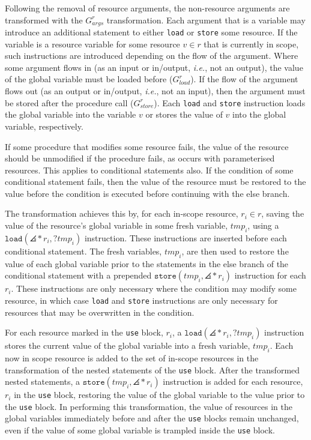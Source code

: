 Following the removal of resource arguments, the non-resource arguments are transformed with the $G_{args}^r$ transformation. Each argument that is a variable may introduce an additional statement to either \texttt{load} or \texttt{store} some resource. If the variable is a resource variable for some resource $v \in r$ that is currently in scope, such instructions are introduced depending on the flow of the argument. Where some argument flows in (as an input or in/output, \textit{i.e.}, not an output), the value of the global variable must be loaded before ($G_{load}^r$). If the flow of the argument flows out (as an output or in/output, \textit{i.e.}, not an input), then the argument must be stored after the procedure call ($G_{store}^r$). Each \texttt{load} and \texttt{store} instruction loads the global variable into the variable $v$ or stores the value of $v$ into the global variable, respectively.

If some procedure that modifies some resource fails, the value of the resource should be unmodified if the procedure fails, as occurs with parameterised resources. This applies to conditional statements also. If the condition of some conditional statement fails, then the value of the resource must be restored to the value before the condition is executed before continuing with the else branch. 

The transformation achieves this by, for each in-scope resource, $r_i \in r$, saving the value of the resource's global variable in some fresh variable, $tmp_i$, using a $\mathtt{load}(\angles*{r_i}, ?tmp_i)$ instruction. These instructions are inserted before each conditional statement. The fresh variables, $tmp_i$, are then used to restore the value of each global variable prior to the statements in the else branch of the conditional statement with a prepended $\mathtt{store}(tmp_i, \angles*{r_i})$ instruction for each $r_i$. These instructions are only necessary where the condition may modify some resource, in which case \texttt{load} and \texttt{store} instructions are only necessary for resources that may be overwritten in the condition.

For each resource marked in the \texttt{use} block, $r_i$, a $\mathtt{load}(\angles*{r_i}, ?tmp_i)$ instruction stores the current value of the global variable into a fresh variable, $tmp_i$. Each now in scope resource is added to the set of in-scope resources in the transformation of the nested statements of the \texttt{use} block. After the transformed nested statements, a $\mathtt{store}(tmp_i, \angles*{r_i})$ instruction is added for each resource, $r_i$ in the \texttt{use} block, restoring the value of the global variable to the value prior to the \texttt{use} block. In performing this transformation, the value of resources in the global variables immediately before and after the \texttt{use} blocks remain unchanged, even if the value of some global variable is trampled inside the \texttt{use} block. 

